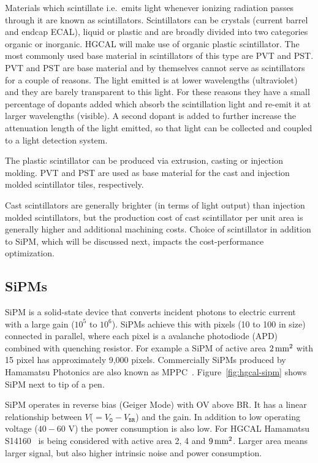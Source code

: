 Materials which scintillate i.e.~emits light
whenever ionizing radiation passes through it are known as
scintillators. Scintillators can be crystals (current barrel and endcap
\gls{ECAL}), liquid or plastic and are broadly divided into two
categories organic or inorganic.
\gls{HGCAL} will make use of organic plastic scintillator. The most
commonly used base material in scintillators of this type are \gls{PVT} and \gls{PST}.
\gls{PVT} and \gls{PST} are base material and
by themselves cannot serve as scintillators for a couple of
reasons. The light emitted is at lower wavelengths (ultraviolet)
and they are barely transparent to this light.
For these reasons they have a small percentage of dopants added
which absorb the scintillation light and re-emit it at larger wavelengths (visible).
A second dopant is added to further increase the attenuation length of
the light emitted, so that light can be collected and coupled to a light
detection system.

The plastic scintillator can be produced via extrusion, casting or injection molding.
\gls{PVT} and \gls{PST} are used as base material for the cast and
injection molded scintillator tiles, respectively.

Cast scintillators are generally brighter (in terms of light output)
than injection molded scintillators, but the production cost of
cast scintillator per unit area is generally higher and additional
machining costs.
Choice of scintillator in addition to \gls{SiPM}, which will be discussed next,
impacts the cost-performance optimization.

\subsection{
  SiPMs
}

\gls{SiPM} is a solid-state device that converts incident photons to electric
current with a large gain (\( 10^5 \) to \( 10^6 \)).
\glspl{SiPM} achieve this with pixels (10\micron{} to 100\micron{} in size)
connected in parallel, where each pixel is a avalanche photodiode (APD)
combined with quenching resistor. For example a \gls{SiPM} of active
area \( 2\,\text{mm}{}^2 \) with 15\micron{} pixel has approximately 9,000 pixels.
Commercially \glspl{SiPM} produced by Hamamatsu Photonics are also known as \gls{MPPC}~\cite{mppc-13360}. Figure~\ref{fig:hgcal-sipm}
shows \gls{SiPM} next to tip of a pen.

\gls{SiPM} operates in reverse bias (Geiger Mode) with \gls{OV} above \gls{BR}.
It has a linear relationship between \(V\)(\(= V_{\texttt{O}} - V_{\texttt{BR}} \)) and the gain.
In addition to low operating voltage (\(40-60\) V) the power
consumption is also low.
For \gls{HGCAL} Hamamatsu S14160~\cite{mppc-14160} is being considered with
active area 2, 4 and \(9\,\text{mm}{}^2\). Larger area means larger signal, but
also higher intrinsic noise and power consumption.

